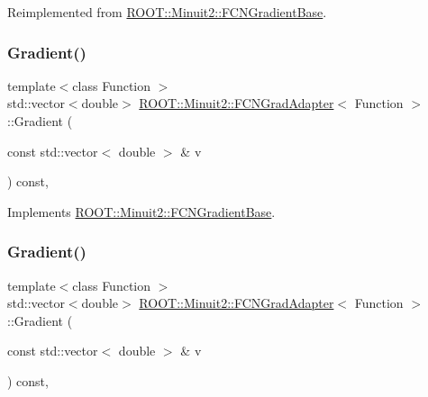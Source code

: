 Reimplemented from \mbox{\hyperlink{classROOT_1_1Minuit2_1_1FCNGradientBase_ae69375c7506f0be6a1ab4e4e937ac555}{R\+O\+O\+T\+::\+Minuit2\+::\+F\+C\+N\+Gradient\+Base}}.

\mbox{\label{classROOT_1_1Minuit2_1_1FCNGradAdapter_ae91d0453fd5e953f75551576659d6c7b}} 
\subsubsection{\texorpdfstring{Gradient()}{Gradient()}\hspace{0.1cm}{\footnotesize\ttfamily [1/3]}}
{\footnotesize\ttfamily template$<$class Function $>$ \\
std\+::vector$<$double$>$ \mbox{\hyperlink{classROOT_1_1Minuit2_1_1FCNGradAdapter}{R\+O\+O\+T\+::\+Minuit2\+::\+F\+C\+N\+Grad\+Adapter}}$<$ Function $>$\+::Gradient (\begin{DoxyParamCaption}\item[{const std\+::vector$<$ double $>$ \&}]{v }\end{DoxyParamCaption}) const\hspace{0.3cm}{\ttfamily [inline]}, {\ttfamily [virtual]}}



Implements \mbox{\hyperlink{classROOT_1_1Minuit2_1_1FCNGradientBase_a004740e7e25a1358aafde6694196ef88}{R\+O\+O\+T\+::\+Minuit2\+::\+F\+C\+N\+Gradient\+Base}}.

\mbox{\label{classROOT_1_1Minuit2_1_1FCNGradAdapter_ae91d0453fd5e953f75551576659d6c7b}} 
\subsubsection{\texorpdfstring{Gradient()}{Gradient()}\hspace{0.1cm}{\footnotesize\ttfamily [2/3]}}
{\footnotesize\ttfamily template$<$class Function $>$ \\
std\+::vector$<$double$>$ \mbox{\hyperlink{classROOT_1_1Minuit2_1_1FCNGradAdapter}{R\+O\+O\+T\+::\+Minuit2\+::\+F\+C\+N\+Grad\+Adapter}}$<$ Function $>$\+::Gradient (\begin{DoxyParamCaption}\item[{const std\+::vector$<$ double $>$ \&}]{v }\end{DoxyParamCaption}) const\hspace{0.3cm}{\ttfamily [inline]}, {\ttfamily [virtual]}}



